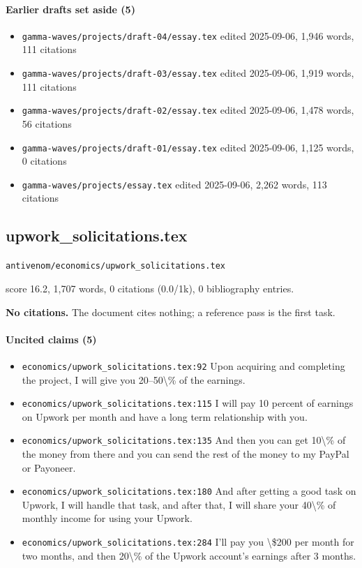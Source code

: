 \documentclass[11pt]{article}
\newcommand{\loc}[1]{{\small\color{muted}\texttt{#1}}}
\begin{document}
\paragraph{Earlier drafts set aside (5)}
\begin{itemize}
\item \loc{gamma-waves/\allowbreak{}projects/\allowbreak{}draft-04/\allowbreak{}essay.tex} edited 2025-09-06, 1,946 words, 111 citations
\item \loc{gamma-waves/\allowbreak{}projects/\allowbreak{}draft-03/\allowbreak{}essay.tex} edited 2025-09-06, 1,919 words, 111 citations
\item \loc{gamma-waves/\allowbreak{}projects/\allowbreak{}draft-02/\allowbreak{}essay.tex} edited 2025-09-06, 1,478 words, 56 citations
\item \loc{gamma-waves/\allowbreak{}projects/\allowbreak{}draft-01/\allowbreak{}essay.tex} edited 2025-09-06, 1,125 words, 0 citations
\item \loc{gamma-waves/\allowbreak{}projects/\allowbreak{}essay.tex} edited 2025-09-06, 2,262 words, 113 citations
\end{itemize}
\subsection{upwork\_solicitations.tex}
\loc{antivenom/\allowbreak{}economics/\allowbreak{}upwork\_solicitations.tex}\par
score 16.2, 1,707 words, 0 citations (0.0/1k), 0 bibliography entries.

\textbf{No citations.} The document cites nothing; a reference pass is the first task.

\paragraph{Uncited claims (5)}
\begin{itemize}
\item \loc{economics/\allowbreak{}upwork\_solicitations.tex:92} Upon acquiring and completing the project, I will give you 20--50\textbackslash{}\% of the earnings.
\item \loc{economics/\allowbreak{}upwork\_solicitations.tex:115} I will pay 10 percent of earnings on Upwork per month and have a long term relationship with you.
\item \loc{economics/\allowbreak{}upwork\_solicitations.tex:135} And then you can get 10\textbackslash{}\% of the money from there and you can send the rest of the money to my PayPal or Payoneer.
\item \loc{economics/\allowbreak{}upwork\_solicitations.tex:180} And after getting a good task on Upwork, I will handle that task, and after that, I will share your 40\textbackslash{}\% of monthly income for using your Upwork.
\item \loc{economics/\allowbreak{}upwork\_solicitations.tex:284} I'll pay you \textbackslash{}\$200 per month for two months, and then 20\textbackslash{}\% of the Upwork account's earnings after 3 months.
\end{itemize}
\end{document}
